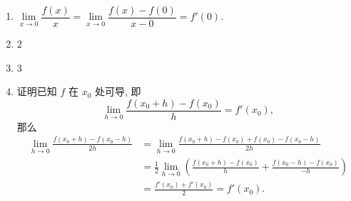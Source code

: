 \documentclass[a4paper, 11pt]{ctexart}
\begin{document}
\pagestyle{empty}
\begin{enumerate}
    \item %
        $\lim\limits_{x\to0}\dfrac{f(x)}{x} = \lim\limits_{x\to0}\dfrac{f(x) - f(0)}{x - 0} = f'(0)$.
    \item 2
    \item 3
    \item %
        {\heiti 证明}\quad 已知 $f$ 在 $x_0$ 处可导, 即
        \[
            \lim_{h\to0}\frac{f(x_0 + h) - f(x_0)}{h} = f'(x_0),    
        \]
        那么
        \begin{align*}
            \lim_{h\to0}\frac{f(x_0+h) - f(x_0-h)}{2h} &= \lim_{h\to0}\frac{f(x_0+h) - f(x_0) + f(x_0) - f(x_0 - h)}{2h} \\
                                                         &= \frac12\lim_{h\to0}\left(\frac{f(x_0+h) - f(x_0)}{h} + \frac{f(x_0 - h) - f(x_0)}{-h}\right) \\
                                                         &= \frac{f'(x_0) + f'(x_0)}{2} = f'(x_0).
        \end{align*}


\end{enumerate}
\end{document}
